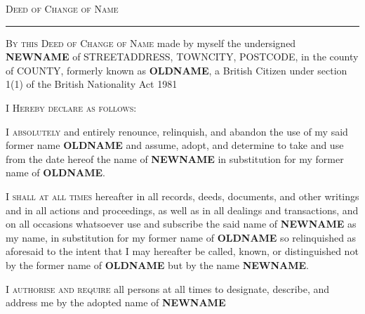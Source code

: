 \documentclass[10pt, twoside, a4paper]{article}
\begin{document}

{
	\centering

	\Huge
	\scshape
	Deed of Change of Name

	\vspace{14pt}

	\hrule

	\par
}

\vspace{48pt}

{\scshape By this Deed of Change of Name} made by myself the undersigned
\textbf{NEWNAME} of {STREETADDRESS}, {TOWNCITY}, {POSTCODE}, in
the county of {COUNTY}, formerly known as \textbf{OLDNAME},
a British Citizen under section 1(1) of the British Nationality Act 1981

\vspace{12pt}

{\scshape I Hereby declare as follows:}

\vspace{12pt}

	{\scshape I absolutely} and entirely renounce, relinquish,
	and abandon the use of my said former name \textbf{OLDNAME}
	and assume, adopt, and determine to take and use from the date hereof
	the name of \textbf{NEWNAME} in substitution for my former
	name of \textbf{OLDNAME}.

\vspace{12pt}

	{\scshape I shall at all times} hereafter in all records, deeds,
	documents, and other writings and in all actions and proceedings, as
	well as in all dealings and transactions, and on all occasions
	whatsoever use and subscribe the said name of \textbf{NEWNAME}
	as my name, in substitution for my former name of
	\textbf{OLDNAME} so relinquished as aforesaid to the intent
	that I may hereafter be called, known, or distinguished not by the
	former name of \textbf{OLDNAME} but by the name
	\textbf{NEWNAME}.

\vspace{12pt}

	{\scshape I authorise and require} all persons at all times to
	designate, describe, and address me by the adopted name of
	\textbf{NEWNAME}

\vspace{12pt}
\end{document}
